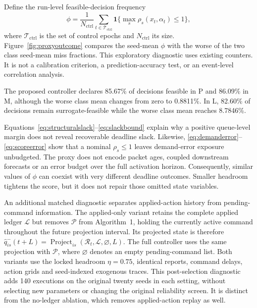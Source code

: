 \documentclass{IEEEoj}
\begin{document}
Define the run-level feasible-decision frequency
\begin{equation}
 \phi=\frac1{N_{\mathrm{ctrl}}}\sum_{t\in\mathcal T_{\mathrm{ctrl}}}
 \mathbf 1\{\max_s\rho_s(x_t,\alpha_t)\le1\},
 \label{eq:feasiblefrequency}
\end{equation}
where $\mathcal T_{\mathrm{ctrl}}$ is the set of control epochs and
$N_{\mathrm{ctrl}}$ its size. Figure~\ref{fig:proxyoutcome} compares the
seed-mean $\phi$ with the worse of the two class seed-mean miss fractions.
This exploratory diagnostic uses existing counters. It is not a calibration
criterion, a prediction-accuracy test, or an event-level correlation analysis.

The proposed controller declares 85.67\%
of decisions feasible in P and 86.09\%
in M, although the worse class mean changes from zero to
0.8811\%.
In L, 82.60\% of decisions remain
surrogate-feasible while the worse class mean reaches
8.7846\%.

Equations~\eqref{eq:structuralslack}--\eqref{eq:slackbound} explain why a positive queue-level margin does not reveal recoverable deadline slack. Likewise, \eqref{eq:demanderror}--\eqref{eq:scoreerror} show that a nominal $\rho_s\le1$ leaves demand-error exposure unbudgeted. The proxy does not encode packet ages, coupled downstream forecasts or an
error budget over the full activation horizon. Consequently, similar values
of $\phi$ can coexist with very different deadline outcomes. Smaller headroom
tightens the score, but it does not repair those omitted state variables.





An additional matched diagnostic separates applied-action history from pending-command information. The applied-only variant retains the complete applied ledger $\mathcal L$ but removes $\mathcal P$ from Algorithm~1, holding the currently active command throughout the future projection interval. Its projected state is therefore $\widehat q^{-}_{is}(t+L)=\operatorname{Project}_{is}(\mathcal R_t,\mathcal L,\varnothing,L)$. The full controller uses the same projection with $\mathcal P$, where $\varnothing$ denotes an empty pending-command list. Both variants use the locked headroom $\eta=0.75$, identical reports, command delays, action grids and seed-indexed exogenous traces. This post-selection diagnostic adds 140 executions on the original twenty seeds in each setting, without selecting new parameters or changing the original reliability screen. It is distinct from the no-ledger ablation, which removes applied-action replay as well.
\end{document}
